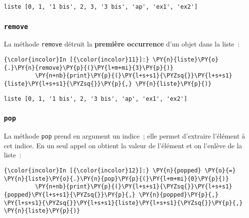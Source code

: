     \begin{Verbatim}[commandchars=\\\{\}]
liste [0, 1, '1 bis', 2, 3, '3 bis', 'ap', 'ex1', 'ex2']

    \end{Verbatim}

    \hypertarget{remove}{%
\subsubsection{\texorpdfstring{\texttt{remove}}{remove}}\label{remove}}

    La méthode \texttt{remove} détruit la \textbf{première occurrence} d'un
objet dans la liste~:

    \begin{Verbatim}[commandchars=\\\{\}]
{\color{incolor}In [{\color{incolor}11}]:} \PY{n}{liste}\PY{o}{.}\PY{n}{remove}\PY{p}{(}\PY{l+m+mi}{3}\PY{p}{)}
         \PY{n+nb}{print}\PY{p}{(}\PY{l+s+s1}{\PYZsq{}}\PY{l+s+s1}{liste}\PY{l+s+s1}{\PYZsq{}}\PY{p}{,} \PY{n}{liste}\PY{p}{)}
\end{Verbatim}


    \begin{Verbatim}[commandchars=\\\{\}]
liste [0, 1, '1 bis', 2, '3 bis', 'ap', 'ex1', 'ex2']

    \end{Verbatim}

    \hypertarget{pop}{%
\subsubsection{\texorpdfstring{\texttt{pop}}{pop}}\label{pop}}

    La méthode \texttt{pop} prend en argument un indice~; elle permet
d'extraire l'élément à cet indice. En un seul appel on obtient la valeur
de l'élément et on l'enlève de la liste~:

    \begin{Verbatim}[commandchars=\\\{\}]
{\color{incolor}In [{\color{incolor}12}]:} \PY{n}{popped} \PY{o}{=} \PY{n}{liste}\PY{o}{.}\PY{n}{pop}\PY{p}{(}\PY{l+m+mi}{0}\PY{p}{)}
         \PY{n+nb}{print}\PY{p}{(}\PY{l+s+s1}{\PYZsq{}}\PY{l+s+s1}{popped}\PY{l+s+s1}{\PYZsq{}}\PY{p}{,} \PY{n}{popped}\PY{p}{,} \PY{l+s+s1}{\PYZsq{}}\PY{l+s+s1}{liste}\PY{l+s+s1}{\PYZsq{}}\PY{p}{,} \PY{n}{liste}\PY{p}{)}
\end{Verbatim}


